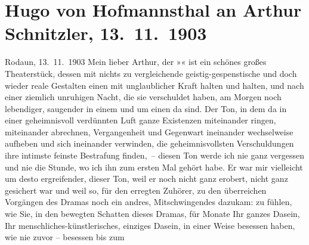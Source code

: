 

               \section[Hugo von Hofmannsthal an Arthur Schnitzler, 13. 11. 1903]{ Hugo von Hofmannsthal an Arthur Schnitzler, 13. 11. 1903}\nopagebreak{}\rehead{ }\begin{ledgroupsized}[t]{13cm}\normalsize\beginnumbering{} \toendnotes[C]{\smallbreak\pagebreak[2]} \toendnotes[C]{\smallbreak}\pstart
           \raggedleft{}{\pb}Rodaun, 13. 11. 1903\pend
           \pstart{}Mein lieber Arthur, \pend\pstart
           der »« ist ein schönes großes Theaterstück, dessen mit nichts zu vergleichende
               geistig-gespenstische und doch wieder reale Gestalten einen mit unglaublicher Kraft
               halten und halten, und nach einer ziemlich unruhigen Nacht, die sie verschuldet
               haben, am Morgen noch lebendiger, saugender in einem und um einen da sind. Der Ton,
               in dem da in einer geheimnisvoll verdünnten Luft ganze Existenzen miteinander ringen,
               miteinander abrechnen, Vergangenheit und Gegenwart ineinander wechselweise aufheben
               und sich ineinander verwinden, die geheimnisvollsten Verschuldungen ihre intimste
               feinste Bestrafung finden, – diesen Ton werde ich nie ganz vergessen und nie die
               Stunde, wo ich ihn zum ersten Mal gehört habe. Er war mir vielleicht um desto
               ergreifender, dieser Ton, weil er noch nicht ganz erobert, nicht ganz gesichert war
               und weil so, für den erregten Zuhörer, zu den überreichen Vorgängen des Dramas noch
               ein andres, Mitschwingendes dazukam: zu fühlen, wie Sie, in den bewegten Schatten
               dieses Dramas, für Monate Ihr ganzes Dasein, Ihr menschliches-künstlerisches,
               einziges Dasein, in einer Weise besessen haben, wie nie zuvor – besessen bis zum

\end{ledgroupsized}
